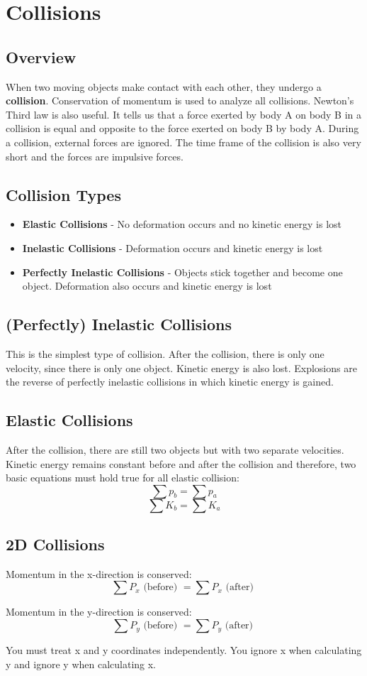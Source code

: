 \section{Collisions}

\subsection{Overview}
When two moving objects make contact with each other, they undergo a \textbf{collision}. Conservation of momentum is used to analyze all collisions. Newton's Third law is also useful. It tells us that a force exerted by body A on body B in a collision is equal and opposite to the force exerted on body B by body A. During a collision, external forces are ignored. The time frame of the collision is also very short and the forces are impulsive forces.

\subsection{Collision Types}
\begin{itemize}
	\item \textbf{Elastic Collisions} - No deformation occurs and no kinetic energy is lost
	\item \textbf{Inelastic Collisions} - Deformation occurs and kinetic energy is lost
	\item \textbf{Perfectly Inelastic Collisions} - Objects stick together and become one object. Deformation also occurs and kinetic energy is lost
\end{itemize}

\subsection{(Perfectly) Inelastic Collisions}
This is the simplest type of collision. After the collision, there is only one velocity, since there is only one object. Kinetic energy is also lost. Explosions are the reverse of perfectly inelastic collisions in which kinetic energy is gained. 

\subsection{Elastic Collisions}
After the collision, there are still two objects but with two separate velocities. Kinetic energy remains constant before and after the collision and therefore, two basic equations must hold true for all elastic collision: \[\sum p_b =\sum p_a\] \[\sum K_b =\sum K_a\]

\subsection{2D Collisions}
Momentum in the x-direction is conserved:
\[\sum P_x\mbox{ (before) }= \sum P_x\mbox{ (after) }\]

Momentum in the y-direction is conserved:
\[\sum P_y\mbox{ (before) }= \sum P_y\mbox{ (after) }\] 

You must treat x and y coordinates independently. You ignore x when calculating y and ignore y when calculating x.